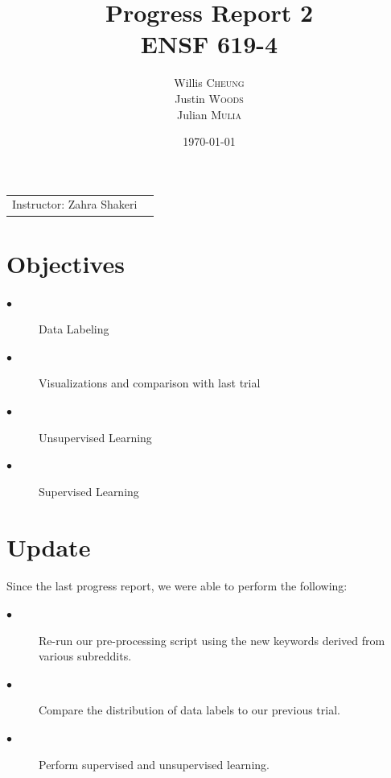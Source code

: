 \documentclass{article}
\title{Progress Report 2 \\ ENSF 619-4} %
\author{Willis \textsc{Cheung}
\\ Justin \textsc{Woods}
\\ Julian \textsc{Mulia}}
\date{\today} %
\begin{document}
\maketitle %

\begin{center}
\begin{tabular}{l r}
Instructor: Zahra Shakeri  %
\end{tabular}
\end{center}



\section{Objectives}

\begin{description}
  \item[$\bullet$ ] Data Labeling
  \item[$\bullet$ ] Visualizations and comparison with last trial
  \item[$\bullet$ ]	Unsupervised Learning
  \item[$\bullet$ ] Supervised Learning
\end{description}



\section{Update}

\paragraph{}
Since the last progress report, we were able to perform the following:

\begin{description}
  \item[$\bullet$ ] Re-run our pre-processing script using the new keywords derived from various subreddits.  
  \item[$\bullet$ ] Compare the distribution of data labels to our previous trial.
  \item[$\bullet$ ] Perform supervised and unsupervised learning.
\end{description}
\end{document}
